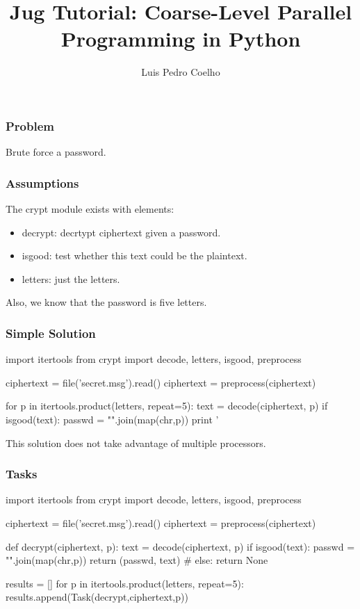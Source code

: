 \documentclass{beamer}
\title[Jug Tutorial 0]{Jug Tutorial: Coarse-Level Parallel Programming in Python}
\author{Luis Pedro Coelho}
\institute{lpc@cmu.edu}
\begin{document}
\frame{\titlepage}
\begin{frame}[fragile]
\frametitle{Problem}
Brute force a password.
\end{frame}


\begin{frame}[fragile]
\frametitle{Assumptions}
The \alert{crypt} module exists with elements:
\begin{itemize}
\item decrypt: decrtypt ciphertext given a password.
\item isgood: test whether this text could be the plaintext.
\item letters: just the letters.
\end{itemize}

Also, we know that the password is five letters.
\end{frame}

\begin{frame}[fragile]
\frametitle{Simple Solution}

\begin{python}
import itertools
from crypt import decode, letters, isgood, preprocess

ciphertext = file('secret.msg').read()
ciphertext = preprocess(ciphertext)

for p in itertools.product(letters, repeat=5):
    text = decode(ciphertext, p)
    if isgood(text):
        passwd = "".join(map(chr,p))
        print '%
\end{python}
\end{frame}

\begin{frame}[fragile]

This solution does not take advantage of multiple processors.
\end{frame}


\begin{frame}[fragile]
\frametitle{Tasks}
\begin{python}
import itertools
from crypt import decode, letters, isgood, preprocess

ciphertext = file('secret.msg').read()
ciphertext = preprocess(ciphertext)

def decrypt(ciphertext, p):
    text = decode(ciphertext, p)
    if isgood(text):
        passwd = "".join(map(chr,p))
        return (passwd, text)
    # else: return None

results = []
for p in itertools.product(letters, repeat=5):
    results.append(Task(decrypt,ciphertext,p))
\end{python}
\end{frame}
\end{document}
